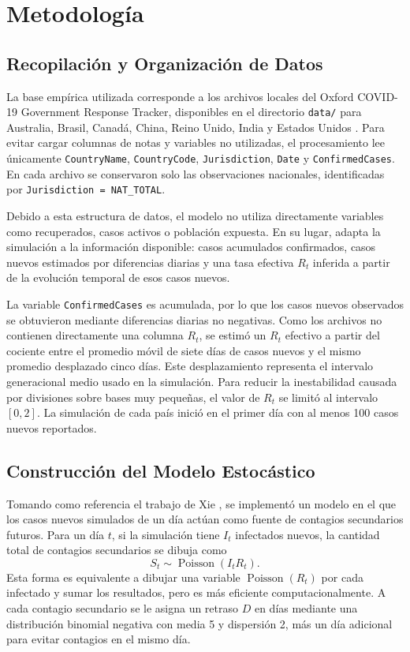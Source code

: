 \documentclass[12pt]{article}
\begin{document}
\newpage

\section{Metodología}

\subsection{Recopilación y Organización de Datos}

La base empírica utilizada corresponde a los archivos locales del Oxford
COVID-19 Government Response Tracker, disponibles en el directorio
\texttt{data/} para Australia, Brasil, Canadá, China, Reino Unido, India y
Estados Unidos \cite{Hale2021}. Para evitar cargar columnas de notas y
variables no utilizadas, el procesamiento lee únicamente
\texttt{CountryName}, \texttt{CountryCode}, \texttt{Jurisdiction},
\texttt{Date} y \texttt{ConfirmedCases}. En cada archivo se conservaron solo
las observaciones nacionales, identificadas por
\texttt{Jurisdiction = NAT\_TOTAL}.

Debido a esta estructura de datos, el modelo no utiliza directamente variables
como recuperados, casos activos o población expuesta. En su lugar, adapta la
simulación a la información disponible: casos acumulados confirmados, casos
nuevos estimados por diferencias diarias y una tasa efectiva \(R_t\) inferida
a partir de la evolución temporal de esos casos nuevos.

La variable \texttt{ConfirmedCases} es acumulada, por lo que los casos nuevos
observados se obtuvieron mediante diferencias diarias no negativas. Como los
archivos no contienen directamente una columna \(R_t\), se estimó un
\(R_t\) efectivo a partir del cociente entre el promedio móvil de siete días de
casos nuevos y el mismo promedio desplazado cinco días. Este desplazamiento
representa el intervalo generacional medio usado en la simulación. Para reducir
la inestabilidad causada por divisiones sobre bases muy pequeñas, el valor de
\(R_t\) se limitó al intervalo \([0,2]\). La simulación de cada país inició en
el primer día con al menos 100 casos nuevos reportados.

\subsection{Construcción del Modelo Estocástico}

Tomando como referencia el trabajo de Xie \cite{Xie2020}, se implementó un
modelo en el que los casos nuevos simulados de un día actúan como fuente de
contagios secundarios futuros. Para un día \(t\), si la simulación tiene
\(I_t\) infectados nuevos, la cantidad total de contagios secundarios se dibuja
como
\[
  S_t \sim \operatorname{Poisson}(I_t R_t).
\]
Esta forma es equivalente a dibujar una variable
\(\operatorname{Poisson}(R_t)\) por cada infectado y sumar los resultados, pero
es más eficiente computacionalmente. A cada contagio secundario se le asigna
un retraso \(D\) en días mediante una distribución binomial negativa con media
5 y dispersión 2, más un día adicional para evitar contagios en el mismo día.
\end{document}
